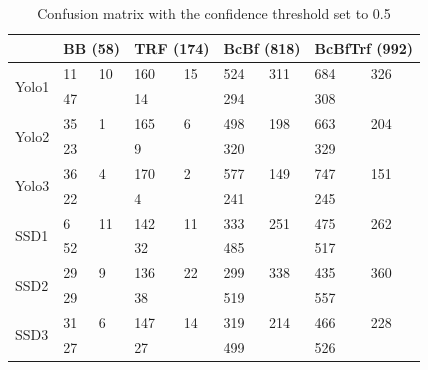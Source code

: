 \begin{table}[h!]
\centering
\begin{tabular}{l|ll|ll|ll|ll}
                       & \multicolumn{2}{l|}{BB (58)} & \multicolumn{2}{l|}{TRF (174)} & \multicolumn{2}{l|}{BcBf (818)} & \multicolumn{2}{l|}{BcBfTrf (992)} \\ \hline
\multirow{2}{*}{Yolo1} & 11            & 10           & 160            & 15            & 524            & 311            & 684              & 326             \\
                       & 47            &              & 14             &               & 294            &                & 308              &                 \\ \hline
\multirow{2}{*}{Yolo2} & 35            & 1            & 165            & 6             & 498            & 198            & 663              & 204             \\
                       & 23            &              & 9              &               & 320            &                & 329              &                 \\ \hline
\multirow{2}{*}{Yolo3} & 36            & 4            & 170            & 2             & 577            & 149            & 747              & 151             \\
                       & 22            &              & 4              &               & 241            &                & 245              &                 \\ \hline
\multirow{2}{*}{SSD1}  & 6             & 11           & 142            & 11            & 333            & 251            & 475              & 262             \\
                       & 52            &              & 32             &               & 485            &                & 517              &                 \\ \hline
\multirow{2}{*}{SSD2}  & 29            & 9            & 136            & 22            & 299            & 338            & 435              & 360             \\
                       & 29            &              & 38             &               & 519            &                & 557              &                 \\ \hline
\multirow{2}{*}{SSD3}  & 31            & 6            & 147            & 14            & 319            & 214            & 466              & 228             \\
                       & 27            &              & 27             &               & 499            &                & 526              &                
\end{tabular}
\caption{Confusion matrix with the confidence threshold set to 0.5}
\label{tab:conf_05}
\end{table}

